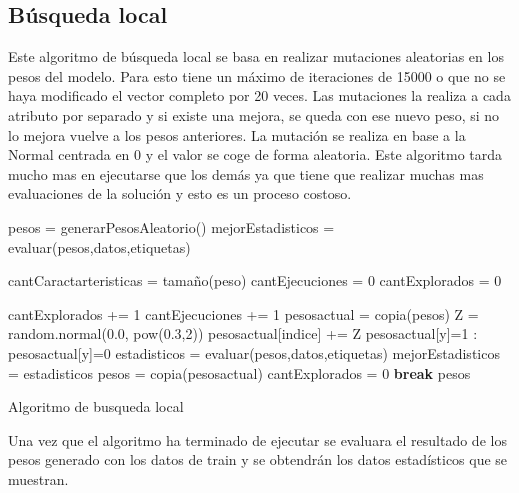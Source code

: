 \documentclass[12pt,a4paper]{article}
\begin{document}
\subsection{Búsqueda local}
Este algoritmo de búsqueda local se basa en realizar mutaciones aleatorias en los pesos del modelo. Para esto tiene un máximo de iteraciones de 15000 o que no se haya modificado el vector completo por 20 veces. Las mutaciones la realiza a cada atributo por separado y si existe una mejora, se queda con ese nuevo peso, si no lo mejora vuelve a los pesos anteriores. La mutación se realiza en base a la Normal centrada en 0 y el valor se coge de forma aleatoria. Este algoritmo tarda mucho mas en ejecutarse que los demás ya que tiene que realizar muchas mas evaluaciones de la solución y esto es un proceso costoso. 

\begin{algorithm}[H]
	\begin{algorithmic}[1]
		\State pesos = generarPesosAleatorio()
		\State mejorEstadisticos = evaluar(pesos,datos,etiquetas)
		
		\State cantCaractarteristicas = tamaño(peso)
		\State cantEjecuciones = 0
		\State cantExplorados = 0
		
				\State cantExplorados += 1
				\State cantEjecuciones += 1
				\State pesosactual =  copia(pesos)
				\State Z =  random.normal(0.0, pow(0.3,2))
				\State pesosactual[indice] += Z
					\State pesosactual[y]=1
				 :
					\State pesosactual[y]=0
				\EndIf
				\State estadisticos = evaluar(pesos,datos,etiquetas)
					\State mejorEstadisticos = estadisticos
					\State pesos =  copia(pesosactual)
					\State cantExplorados = 0
					\State \textbf{break}
				\EndIf
				\EndIf
			 \EndFor
		\EndWhile
		\State \Return pesos
	\end{algorithmic}
	\label{alg:bl}
	\caption{Algoritmo de busqueda local}
\end{algorithm}

Una vez que el algoritmo ha terminado de ejecutar se evaluara el resultado de los pesos generado con los datos de train y se obtendrán los datos estadísticos que se muestran.
\end{document}

